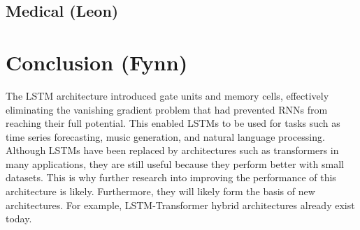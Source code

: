 \documentclass[twoside,a4paper,10pt,DIV=12,BCOR=12mm]{scrartcl}
\begin{document}
\subsection{Medical (Leon)}

\section{Conclusion (Fynn)}
The LSTM architecture introduced gate units and memory cells, effectively eliminating the vanishing gradient problem that had prevented RNNs from reaching their full potential.\cite{hochreiter1997lstm} 
This enabled LSTMs to be used for tasks such as time series forecasting, music generation, and natural language processing.\cite{eck2002musicgeneration,nielsen2024electricitypriceforcasting,gers2001timeseries,torres2022elctricityforecasting,sak2014longshorttermmemorybased}\\
Although LSTMs have been replaced by architectures such as transformers in many applications, they are still useful because they perform better with small datasets. This is why further research into improving the performance of this architecture is likely.\cite{alselwi2024lstmfuture} Furthermore, they will likely form the basis of new architectures. For example, LSTM-Transformer hybrid architectures already exist today. \cite{zhao2025lstmtransformerhybrid} 


\end{document}
